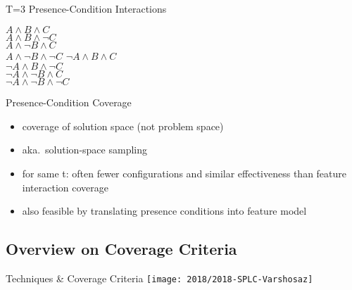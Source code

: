 \begin{frame}{\myframetitle{} }
\begin{mycolumns}[widths={48}]
\begin{example}{{T=3 Presence-Condition Interactions}}
			\begin{mycolumns}[animation=none]
				$A \wedge B \wedge C$\\
				$A \wedge B \wedge \neg C$\\
				$A \wedge \neg B \wedge C$\\
				$A \wedge \neg B \wedge \neg C$
			\mynextcolumn
				$\neg A \wedge B \wedge C$\\
				$\neg A \wedge B \wedge \neg C$\\
				$\neg A \wedge \neg B \wedge C$\\
				$\neg A \wedge \neg B \wedge \neg C$
			\end{mycolumns}
		\end{example}
		\pause
		\begin{note}{Presence-Condition Coverage\mysource{\krieterpresenceconditioncoverage}}
			\begin{itemize}
				\item coverage of solution space (not problem space)
				\item aka.\ solution-space sampling
				\item for same t: often fewer configurations and similar effectiveness than feature interaction coverage
				\item also feasible by translating presence conditions into feature model \mysource{\hentzesolutionspacesampling}
			\end{itemize}
		\end{note}
	\end{mycolumns}
\end{frame}

\subsection{Overview on Coverage Criteria}
\begin{frame}{\myframetitle{} }
	\begin{definition}{Techniques \& Coverage Criteria \mysource{\samplingsurvey}}
		\texttt{[image: 2018/2018-SPLC-Varshosaz]}
	\end{definition}
\end{frame}

